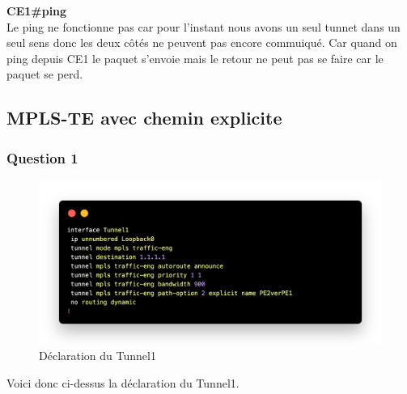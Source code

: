 \documentclass[12pt, a4paper]{article}
\begin{document}
\textbf{CE1\#ping}\\

Le ping ne fonctionne pas car pour l'instant nous avons un seul tunnet dans un seul
sens donc les deux côtés ne peuvent pas encore commuiqué. Car quand on ping depuis 
CE1 le paquet s'envoie mais le retour ne peut pas se faire car le paquet se perd. 












\subsection{MPLS-TE avec chemin explicite}
\subsubsection{Question 1}
\begin{figure}[h]
    \centering
    \includegraphics[width=1\textwidth]{img/code11.png}
    \caption{Déclaration du Tunnel1}
    \label{fig:script11}
\end{figure}
Voici donc ci-dessus la déclaration du Tunnel1.
\end{document}
